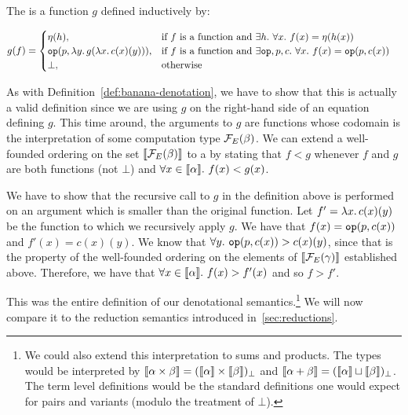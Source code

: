 \begin{definition}
  The  is a function $g$
  defined inductively by:
  
  \begin{align*}
    g(f) &= \begin{cases}
      \eta(h), & \text{if $f$ is a function and $\exists h.\ \forall x.\ f(x) = \eta(h(x))$} \\
      \mathtt{op}(p, \lambda y.\, g(\lambda x.\, c(x)(y))), & \text{if $f$ is a function and $\exists \mathtt{op},p,c.\ \forall x.\ f(x) = \mathtt{op}(p, c(x))$} \\
      \bot, & \text{otherwise} \\
    \end{cases}
  \end{align*}
  
  As with Definition~\ref{def:banana-denotation}, we have to show that this
  is actually a valid definition since we are using $g$ on the right-hand
  side of an equation defining $g$. This time around, the arguments to $g$
  are functions whose codomain is the interpretation of some computation
  type $\mathcal{F}_E(\beta)$. We can extend a well-founded ordering on the set
  $\llbracket \mathcal{F}_E(\beta) \rrbracket$ to a  by stating that $f < g$ whenever $f$
  and $g$ are both functions (not $\bot$) and
  $\forall x \in \llbracket \alpha \rrbracket.\ f(x) < g(x)$.
  
  We have to show that the recursive call to $g$ in the definition above is
  performed on an argument which is smaller than the original function. Let
  $f' = \lambda x.\, c(x)(y)$ be the function to which we recursively apply
  $g$. We have that $f(x) = \mathtt{op}(p, c(x))$ and $f'(x) = c(x)(y)$. We
  know that $\forall y.\ \mathtt{op}(p, c(x)) > c(x)(y)$, since that is the
  property of the well-founded ordering on the elements of
  $\llbracket \mathcal{F}_E(\gamma) \rrbracket$ established above. Therefore, we have that
  $\forall x \in \llbracket \alpha \rrbracket.\ f(x) > f'(x)$ and so $f > f'$.
\end{definition}

This was the entire definition of our denotational semantics.\footnote{We
  could also extend this interpretation to sums and products. The types
  would be interpreted by
  $\llbracket \alpha \times \beta \rrbracket = (\llbracket \alpha \rrbracket \times \llbracket \beta \rrbracket)_\bot$ and
  $\llbracket \alpha + \beta \rrbracket = (\llbracket \alpha \rrbracket \sqcup \llbracket \beta \rrbracket)_\bot$. The term
  level definitions would be the standard definitions one would expect for
  pairs and variants (modulo the treatment of $\bot$).} We will now compare
it to the reduction semantics introduced in~\ref{sec:reductions}.

